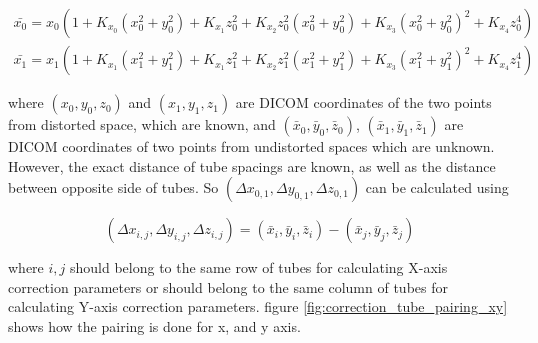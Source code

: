 \begin{eqnarray} \label{eq:xy_setup_sample}
\bar{x_0} = x_0(1 + K_{x_0}(x_0^2 + y_0^2) + K_{x_1}z_0^2 + K_{x_2}z_0^2(x_0^2 + y_0^2) 
+ K_{x_3}(x_0^2 + y_0^2)^2 + K_{x_4}z_0^4)  \\
\bar{x_1} = x_1(1 + K_{x_1}(x_1^2 + y_1^2) + K_{x_1}z_1^2 + K_{x_2}z_1^2(x_1^2 + y_1^2) 
+ K_{x_3}(x_1^2 + y_1^2)^2 + K_{x_4}z_1^4) 
\end{eqnarray}

where $(x_0, y_0, z_0)$ and $(x_1, y_1, z_1)$ are DICOM coordinates of the two points from distorted space, 
which are known, and $(\bar{x}_0, \bar{y}_0, \bar{z}_0)$, $(\bar{x}_1, \bar{y}_1, \bar{z}_1)$ are DICOM 
coordinates of two points from undistorted spaces which are unknown. However, the exact distance of tube
spacings are known, as well as the distance between opposite side of tubes. So 
$(\Delta{x}_{0,1}, \Delta{y}_{0,1}, \Delta{z}_{0,1})$ can be calculated using 

\begin{equation}
  (\Delta{x}_{i,j}, \Delta{y}_{i,j}, \Delta{z}_{i,j}) = 
  (\bar{x}_i, \bar{y}_i, \bar{z}_i) - (\bar{x}_j, \bar{y}_j, \bar{z}_j)
\end{equation}

where $i, j$ should belong to the same row of tubes for calculating X-axis correction parameters 
or should belong to the same column of tubes for calculating Y-axis correction parameters. 
figure \ref{fig:correction_tube_pairing_xy} shows how the pairing is done for x, and y axis. 

